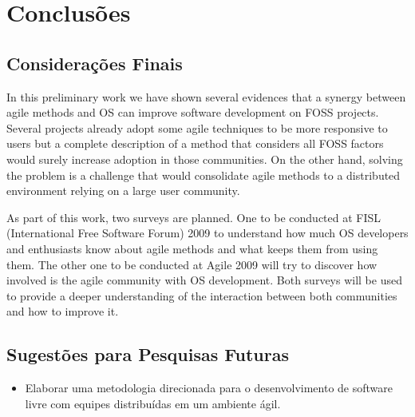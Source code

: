 \chapter{Conclusões}
\label{cap:conclusoes}

\section{Considerações Finais} 


In this preliminary work we have shown several evidences that a
synergy between agile methods and OS can improve software development
on FOSS projects. Several projects already adopt some agile techniques
to be more responsive to users but a complete description of a method
that considers all FOSS factors would surely increase adoption in
those communities. On the other hand, solving the problem is a
challenge that would consolidate agile methods to a distributed
environment relying on a large user community.

As part of this work, two surveys are planned. One to be conducted at
FISL (International Free Software Forum) 2009 to understand how much
OS developers and enthusiasts know about agile methods and what keeps
them from using them. The other one to be conducted at Agile 2009 will
try to discover how involved is the agile community with OS
development. Both surveys will be used to provide a deeper
understanding of the interaction between both communities and how to
improve it.


\section{Sugestões para Pesquisas Futuras} 

\begin{itemize}
	\item Elaborar uma metodologia direcionada para o
          desenvolvimento de software livre com equipes distribuídas
          em um ambiente ágil.
\end{itemize}
